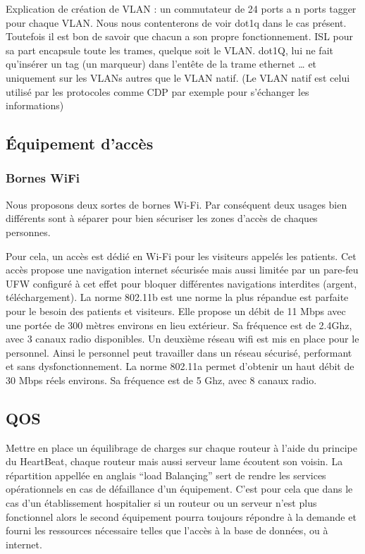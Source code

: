 Explication de création de VLAN :
un commutateur de 24 ports a n ports tagger pour chaque VLAN.
Nous  nous contenterons de voir dot1q dans le cas présent. Toutefois il est bon de savoir que chacun a son propre fonctionnement. ISL pour sa part encapsule toute les trames, quelque soit le VLAN. dot1Q, lui ne fait qu'insérer un tag (un marqueur) dans l'entête de la trame ethernet … et uniquement sur les VLANs autres que le VLAN natif. (Le VLAN natif est celui utilisé par les protocoles comme CDP par exemple pour s'échanger les informations)

%
%
\subsection{Équipement d'accès}

%
\subsubsection{Bornes WiFi}
Nous proposons deux sortes de bornes Wi-Fi. Par conséquent deux usages bien différents sont à séparer pour bien sécuriser les zones d'accès de chaques personnes.

Pour cela, un accès est dédié en Wi-Fi pour les visiteurs appelés les patients. Cet accès propose une navigation internet sécurisée mais aussi limitée par un pare-feu UFW configuré à cet effet pour bloquer différentes navigations interdites (argent, téléchargement). La norme 802.11b est une norme la plus répandue est parfaite pour le besoin des patients et visiteurs. Elle propose un débit de 11 Mbps avec une portée de 300 mètres environs en lieu extérieur. Sa fréquence est de 2.4Ghz, avec 3 canaux radio disponibles.
Un deuxième réseau wifi est mis en place pour le personnel. Ainsi le personnel peut travailler dans un réseau sécurisé, performant et sans dysfonctionnement. La norme 802.11a permet d'obtenir un haut débit de 30 Mbps réels environs. Sa fréquence est de 5 Ghz, avec 8 canaux radio.

%
%
\subsection{QOS}

Mettre en place un équilibrage de charges sur chaque routeur à l'aide du principe du HeartBeat, chaque routeur mais aussi serveur lame écoutent son voisin. La répartition appellée en anglais “load Balançing” sert de rendre les services opérationnels en cas de défaillance d'un équipement. C'est pour cela que dans le cas d'un établissement hospitalier si un routeur ou un serveur n'est plus fonctionnel alors le second équipement pourra toujours répondre à la demande et fourni les ressources nécessaire telles que l'accès à la base de données, ou à internet.
